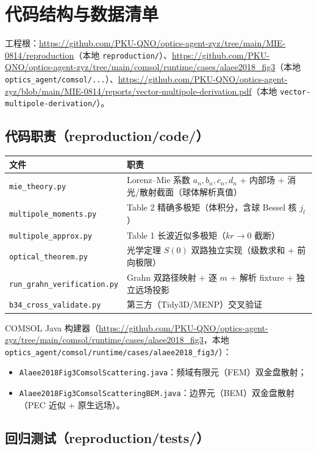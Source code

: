 \section{代码结构与数据清单}

工程根：\url{https://github.com/PKU-QNO/optics-agent-zyz/tree/main/MIE-0814/reproduction}（本地 \texttt{reproduction/}）、\url{https://github.com/PKU-QNO/optics-agent-zyz/tree/main/comsol/runtime/cases/alaee2018_fig3}（本地 \texttt{optics\_agent/comsol/...}）、\url{https://github.com/PKU-QNO/optics-agent-zyz/blob/main/MIE-0814/reports/vector-multipole-derivation.pdf}（本地 \texttt{vector-multipole-derivation/}）。

\subsection{代码职责（reproduction/code/）}

\begin{longtable}{p{5.2cm}p{7.6cm}}
\toprule
文件 & 职责 \\
\midrule
\endhead
\texttt{mie\_theory.py} & Lorenz--Mie 系数 $a_n,b_n,c_n,d_n$ + 内部场 + 消光/散射截面（球体解析真值） \\
\texttt{multipole\_moments.py} & Table 2 精确多极矩（体积分，含球 Bessel 核 $j_l$） \\
\texttt{multipole\_approx.py} & Table 1 长波近似多极矩（$kr\to0$ 截断） \\
\texttt{optical\_theorem.py} & 光学定理 $S(0)$ 双路独立实现（级数求和 + 前向极限） \\
\texttt{run\_grahn\_verification.py} & Grahn 双路径映射 + 逐 $m$ + 解析 fixture + 独立远场投影 \\
\texttt{b34\_cross\_validate.py} & 第三方（Tidy3D/MENP）交叉验证 \\
\bottomrule
\end{longtable}

COMSOL Java 构建器（\url{https://github.com/PKU-QNO/optics-agent-zyz/tree/main/comsol/runtime/cases/alaee2018_fig3}，本地 \texttt{optics\_agent/comsol/runtime/cases/alaee2018\_fig3/}）：
\begin{itemize}
  \item \texttt{Alaee2018Fig3ComsolScattering.java}：频域有限元（FEM）双金盘散射；
  \item \texttt{Alaee2018Fig3ComsolScatteringBEM.java}：边界元（BEM）双金盘散射（PEC 近似 + 原生远场）。
\end{itemize}

\subsection{回归测试（reproduction/tests/）}

